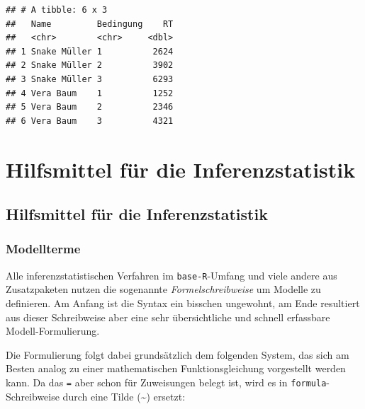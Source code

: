 \documentclass[
]{book}
\begin{document}
\begin{verbatim}
## # A tibble: 6 x 3
##   Name         Bedingung    RT
##   <chr>        <chr>     <dbl>
## 1 Snake Müller 1          2624
## 2 Snake Müller 2          3902
## 3 Snake Müller 3          6293
## 4 Vera Baum    1          1252
## 5 Vera Baum    2          2346
## 6 Vera Baum    3          4321
\end{verbatim}

\hypertarget{hilfsmittel-fuxfcr-die-inferenzstatistik}{%
\chapter{Hilfsmittel für die Inferenzstatistik}\label{hilfsmittel-fuxfcr-die-inferenzstatistik}}

\hypertarget{hilfsmittel-fuxfcr-die-inferenzstatistik-1}{%
\section{Hilfsmittel für die Inferenzstatistik}\label{hilfsmittel-fuxfcr-die-inferenzstatistik-1}}

\hypertarget{modellterme}{%
\subsection{Modellterme}\label{modellterme}}

Alle inferenzstatistischen Verfahren im \texttt{base-R}-Umfang und viele andere aus Zusatzpaketen nutzen die sogenannte \emph{Formelschreibweise} um Modelle zu definieren.
Am Anfang ist die Syntax ein bisschen ungewohnt, am Ende resultiert aus dieser Schreibweise aber eine sehr übersichtliche und schnell erfassbare Modell-Formulierung.

Die Formulierung folgt dabei grundsätzlich dem folgenden System, das sich am Besten analog zu einer mathematischen Funktionsgleichung vorgestellt werden kann. Da das \texttt{=} aber schon für Zuweisungen belegt ist, wird es in \texttt{formula}-Schreibweise durch eine Tilde (\textasciitilde) ersetzt:

 
  \providecommand{\huxb}[2]{\arrayrulecolor[RGB]{#1}\global\arrayrulewidth=#2pt}
  \providecommand{\huxvb}[2]{\color[RGB]{#1}\vrule width #2pt}
  \providecommand{\huxtpad}[1]{\rule{0pt}{#1}}
  \providecommand{\huxbpad}[1]{\rule[-#1]{0pt}{#1}}
\end{document}
